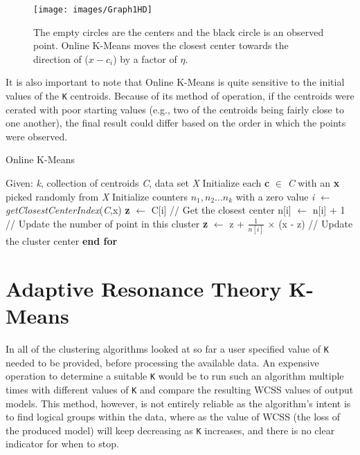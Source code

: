 \documentclass{l4proj}
\begin{document}
\begin{figure}[H]
	\centering
    \label{onlineGraph}
    \texttt{[image: images/Graph1HD]}
    \caption{The empty circles are the centers and the black circle is an observed point. Online K-Means moves the closest center towards the direction of ($x-c_i$) by a factor of $\eta$.} 
\end{figure}

It is also important to note that Online K-Means is quite sensitive to the initial values of the \texttt{K} centroids. Because of its method of operation, if the centroids were cerated with poor starting values (e.g., two of the centroids being fairly close to one another), the final result could differ based on the order in which the points were observed.

\begin{algorithm}
\caption{Online K-Means}\label{online-alg}
\begin{algorithmic}[1]
\State Given: \textit{k}, collection of centroids \textit{C}, data set \textit{X}
\State Initialize each \textbf{c} $\in$ \textit{C} with an \textbf{x} picked randomly from \textit{X}
\State Initialize counters $n_{1}, n_{2} ... n_{k}$ with a zero value
    \State \textit{i}  $\gets$ \textit{getClosestCenterIndex}(\textit{C},x)
    \State \textbf{z}  $\gets$ C[i] \hspace{2.25cm} // Get the closest center
    \State n[i] $\gets$ n[i] + 1 \hspace{1.3cm} // Update the number of point in this cluster
    \State \textbf{z} $\gets$ z + $\frac{1}{n[i]}$ $\times$ (x - z) \hspace{0.35cm} // Update the cluster center
\EndFor
\State \textbf{end for}
\end{algorithmic}
\end{algorithm}

\section{Adaptive Resonance Theory K-Means}

In all of the clustering algorithms looked at so far a user specified value of \texttt{K} needed to be provided, before processing the available data. An expensive operation to determine a suitable \texttt{K} would be to run such an algorithm multiple times with different values of \texttt{K} and compare the resulting WCSS values of output models. This method, however, is not entirely reliable as the algorithm's intent is to find logical groups within the data, where as the value of WCSS (the loss of the produced model) will keep decreasing as \texttt{K} increases, and there is no clear indicator for when to stop\cite{LearnK}.
\end{document}
